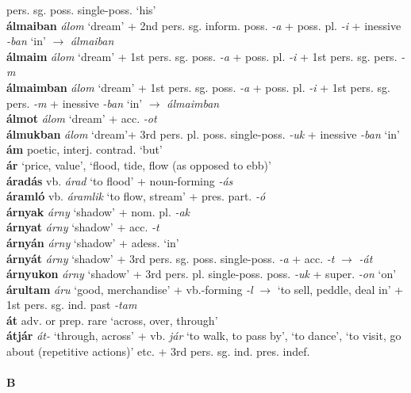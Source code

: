 \documentclass[11pt]{article}
\begin{document}
pers. sg. poss. single\hyp{}poss. `his' \\
\textbf{álmaiban} \emph{álom} `dream' + 2nd
pers. sg. inform. poss. \emph{-a} + poss. pl. \emph{-i} +
inessive \emph{-ban} `in' $\rightarrow$ \emph{álmaiban} \\
\textbf{álmaim} \emph{álom} `dream' + 1st pers. sg. poss. \emph{-a} +
poss. pl. \emph{-i} + 1st pers. sg. pers. \emph{-m} \\
\textbf{álmaimban} \emph{álom} `dream' + 1st pers. sg. poss. \emph{-a}
+ poss. pl. \emph{-i} + 1st pers. sg. pers. \emph{-m} +
  inessive \emph{-ban} `in' $\rightarrow$ \emph{álmaimban} \\
\textbf{álmot} \emph{álom} `dream' + acc. \emph{-ot} \\
\textbf{álmukban} \emph{álom} `dream'+ 3rd
pers. pl. poss. single\hyp{}poss. \emph{-uk} + inessive \emph{-ban} `in' \\
\textbf{ám} poetic, interj. contrad. `but' \\
\textbf{ár} `price, value', `flood, tide, flow (as opposed to ebb)' \\
\textbf{áradás} vb. \emph{árad} `to flood' + noun\hyp{}forming \emph{-ás} \\
\textbf{áramló} vb. \emph{áramlik} `to flow, stream' + pres. part. \emph{-ó} \\
\textbf{árnyak} \emph{árny} `shadow' + nom. pl. \emph{-ak} \\
\textbf{árnyat} \emph{árny} `shadow' + acc. \emph{-t} \\
\textbf{árnyán} \emph{árny} `shadow' + adess. `in' \\
\textbf{árnyát} \emph{árny} `shadow' + 3rd
  pers. sg. poss. single\hyp{}poss. \emph{-a} + acc. \emph{-t} $\rightarrow$ \emph{-át} \\
\textbf{árnyukon} \emph{árny} `shadow' + 3rd
pers. pl. single\hyp{}poss. poss. \emph{-uk} + super. \emph{-on}
`on' \\
\textbf{árultam} \emph{áru} `good, merchandise' +
vb.\hyp{}forming \emph{-l} $\rightarrow$ `to sell, peddle, deal in' +
1st pers. sg. ind. past \emph{-tam} \\
\textbf{át} adv. or prep. rare `across, over, through' \\
\textbf{átjár} \emph{át-} `through, across' + vb. \emph{jár}
`to walk, to pass by', `to dance', `to visit, go about (repetitive
actions)' etc. + 3rd pers. sg. ind. pres. indef. \\
\ \\
\noindent \textbf{\large B} \\
\end{document}
